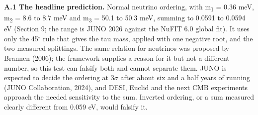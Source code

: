 \documentclass[
  11pt,
]{article}
\begin{document}
\textbf{A.1 The headline prediction.} Normal neutrino ordering, with m\textsubscript{1} = 0.36 meV, m\textsubscript{2} = 8.6 to 8.7 meV and m\textsubscript{3} = 50.1 to 50.3 meV, summing to 0.0591 to 0.0594 eV (Section 9; the range is JUNO 2026 against the NuFIT 6.0 global fit). It uses only the 45\ensuremath{^\circ} rule that gives the tau mass, applied with one negative root, and the two measured splittings. The same relation for neutrinos was proposed by Brannen (2006); the framework supplies a reason for it but not a different number, so this test can falsify both and cannot separate them. JUNO is expected to decide the ordering at 3\ensuremath{\sigma} after about six and a half years of running (JUNO Collaboration, 2024), and DESI, Euclid and the next CMB experiments approach the needed sensitivity to the sum. Inverted ordering, or a sum measured clearly different from 0.059 eV, would falsify it.
\end{document}
